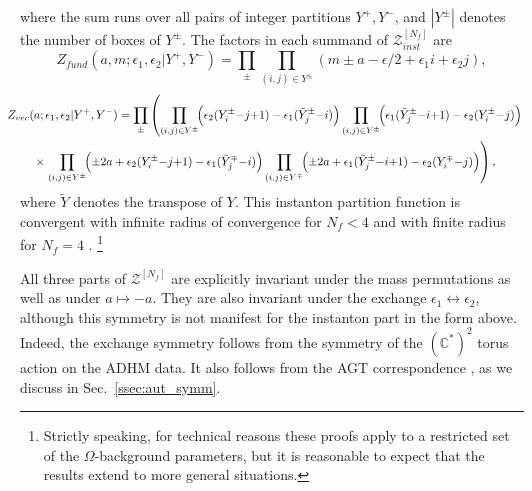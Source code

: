 \documentclass[12pt,a4paper]{article}
\numberwithin{equation}{section}
\begin{document}
\begin{enumerate}
\begin{equation}
\end{equation}
where the sum runs over all pairs of integer partitions $Y^{+}, Y^{-}$, and $|Y^{\pm}|$ denotes the number of boxes of $Y^\pm$. The factors in each summand of $\mathcal{Z}^{[N_f]}_{inst}$ are
 \begin{equation}
   Z_{fund}(a,m;\epsilon_1,\epsilon_2|Y^+,Y^-)=\prod_{\pm}\prod_{(i,j)\in Y^{\pm}} (m\pm a-\epsilon/2+\epsilon_1 i+\epsilon_2 j),
   \end{equation}
   \vspace{-0.7cm}
    \begin{multline}
  \mspace{-20mu}Z_{vec}(a;\epsilon_1,\epsilon_2|Y^+,Y^-)=\prod_{\pm}\left(\prod_{(i,j)\in Y^{\pm}}\!\Bigl(\epsilon_2 (Y^{\pm}_i{-}j{+}1)-\epsilon_1 (\tilde{Y}^{\pm}_j{-}i)\Bigr)\prod_{(i,j)\in Y^{\pm}}\!\Bigl(\epsilon_1 (\tilde{Y}^{\pm}_j{-}i{+}1)-\epsilon_2 (Y^{\pm}_i{-}j)\Bigr)\right.  \\ \mspace{-19mu}\times  \left.\prod_{(i,j)\in Y^{\pm}}\!\Bigl(\pm 2a+\epsilon_2 (Y^{\pm}_i{-}j{+}1)-\epsilon_1 (\tilde{Y}^{\mp}_j{-}i)\Bigr)\prod_{(i,j)\in Y^{\mp}}\!\Bigl(\pm 2a+\epsilon_1 (\tilde{Y}^{\pm}_j{-}i{+}1)-\epsilon_2 (Y^{\mp}_i{-}j)\Bigr)\right),
\end{multline} 
where $\tilde{Y}$ denotes the transpose of $Y$. This instanton partition function is convergent with infinite radius of convergence for $N_f<4$ \cite{ILTy14,Arnaudo:2022ivo} and with finite radius for 
$N_f=4$ \cite{guillarmou2024conformal}.
\footnote{
Strictly speaking, for technical reasons these proofs apply to a restricted set of the $\Omega$-background parameters, but it is reasonable to expect that the results extend to more general situations.}
\end{enumerate}

All three parts of $\mathcal{Z}^{[N_f]}$ are explicitly invariant under the mass permutations as well as under $a\mapsto -a$.
They are also invariant under the exchange $\epsilon_1\leftrightarrow\epsilon_2$, although this symmetry is not manifest for the instanton part in the form above. Indeed, the exchange symmetry follows from the symmetry of the $(\mathbb{C}^*)^2$ torus action on the ADHM data.
It also follows from the AGT correspondence \cite{AGT09}, as we discuss in Sec.~\ref{ssec:aut_symm}.
\end{document}
